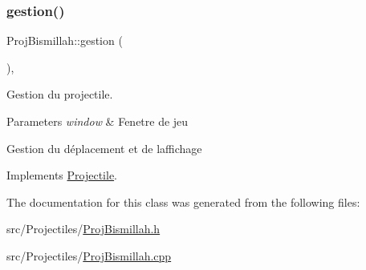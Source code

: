 \subsubsection{\texorpdfstring{gestion()}{gestion()}}
{\footnotesize\ttfamily Proj\+Bismillah\+::gestion (\begin{DoxyParamCaption}{ }\end{DoxyParamCaption})\hspace{0.3cm}{\ttfamily [override]}, {\ttfamily [virtual]}}



Gestion du projectile. 


\begin{DoxyParams}{Parameters}
{\em window} & Fenetre de jeu\\
\hline
\end{DoxyParams}
Gestion du déplacement et de l\textquotesingle{}affichage 

Implements \mbox{\hyperlink{class_projectile_ad8fae955389ff8944830e9d80e0f1ce1}{Projectile}}.



The documentation for this class was generated from the following files\+:\begin{DoxyCompactItemize}
\item 
src/\+Projectiles/\mbox{\hyperlink{_proj_bismillah_8h}{Proj\+Bismillah.\+h}}\item 
src/\+Projectiles/\mbox{\hyperlink{_proj_bismillah_8cpp}{Proj\+Bismillah.\+cpp}}\end{DoxyCompactItemize}
